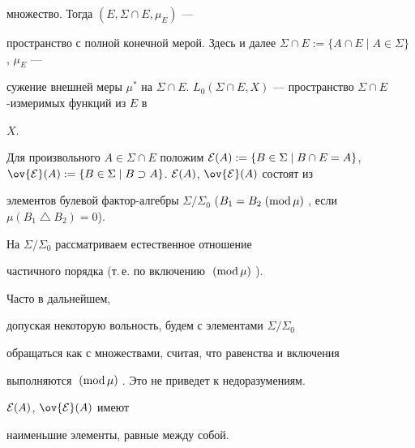 множество. Тогда $(E,\Sigma\cap E,\mu_E)$ ---


пространство с полной конечной мерой. Здесь и далее $\Sigma\cap


E:=\{A\cap E\mid A\in\Sigma\}$ \cite{27}, $\mu_E$ ---


сужение внешней меры $\mu^\ast$ на $\Sigma\cap E$. $L_0(\Sigma\cap


E,X)$ --- пространство $\Sigma\cap E$-из\-ме\-ри\-мых функций из $E$ в


$X$.





Для произвольного $A\in\Sigma\cap E$ положим ${\cal E}(A):=


\{B\in\Sigma\mid B\cap E=A\}$, $\ov{\cal E}(A):=\{B\in\Sigma\mid


B\supset A\}$. ${\cal E}(A)$, $\ov{\cal E}(A)$ состоят из


элементов булевой фак\-тор-ал\-геб\-ры $\Sigma/\Sigma_0$ ($B_1=B_2


\moddd$, если $\mu(B_1\bigtriangleup B_2)=0$).


На $\Sigma/\Sigma_0$ рассматриваем естественное отношение


частичного порядка (т.\,е. по включению $\;(\mathrm{mod}\,\mu)\;$).


Часто в дальнейшем,


допуская некоторую вольность, будем с элементами $\Sigma/\Sigma_0$


обращаться как с множествами, считая, что равенства и включения


выполняются $\;(\mathrm{mod}\,\mu)\;$. Это не приведет к недоразумениям.





\begin{lem}


${\cal E}(A)$, $\ov{\cal E}(A)$ имеют


наименьшие элементы, равные между собой.


\end{lem}





